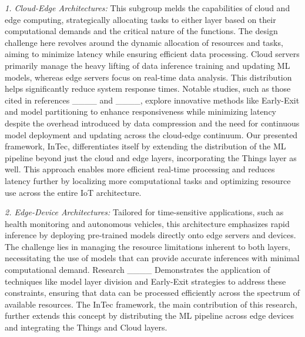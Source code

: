 	\textit{1. Cloud-Edge Architectures:} This subgroup melds the capabilities of cloud and
	edge computing, strategically allocating tasks to either layer based on their computational demands and the critical nature of the functions. The design challenge
	here revolves around the dynamic allocation of resources and tasks, aiming to
	minimize latency while ensuring efficient data processing. Cloud servers primarily manage the heavy lifting of data inference training and updating ML
	models, whereas edge servers focus on real-time data analysis. This distribution
	helps significantly reduce system response times. Notable studies, such as those
	cited in references ____ and ____, explore innovative methods like Early-Exit and
	model partitioning to enhance responsiveness while minimizing latency despite
	the overhead introduced by data compression and the need for continuous model
	deployment and updating across the cloud-edge continuum. Our presented framework, InTec, differentiates itself by extending the distribution of the ML pipeline
	beyond just the cloud and edge layers, incorporating the Things layer as well. This
	approach enables more efficient real-time processing and reduces latency further
	by localizing more computational tasks and optimizing resource use across the
	entire IoT architecture.
	
		\textit{2. Edge-Device Architectures:} Tailored for time-sensitive applications, such as health monitoring and autonomous vehicles, this architecture emphasizes rapid inference by deploying pre-trained models directly onto edge servers and devices. The challenge lies in managing the resource limitations inherent to both layers, necessitating the use of models that can provide accurate inferences with minimal computational demand. Research ____ Demonstrates the application of techniques like model layer division and Early-Exit strategies to address these constraints, ensuring
		that data can be processed efficiently across the spectrum of available resources.
		The InTec framework, the main contribution of this research, further extends this
		concept by distributing the ML pipeline across edge devices and integrating the
		Things and Cloud layers.
	
